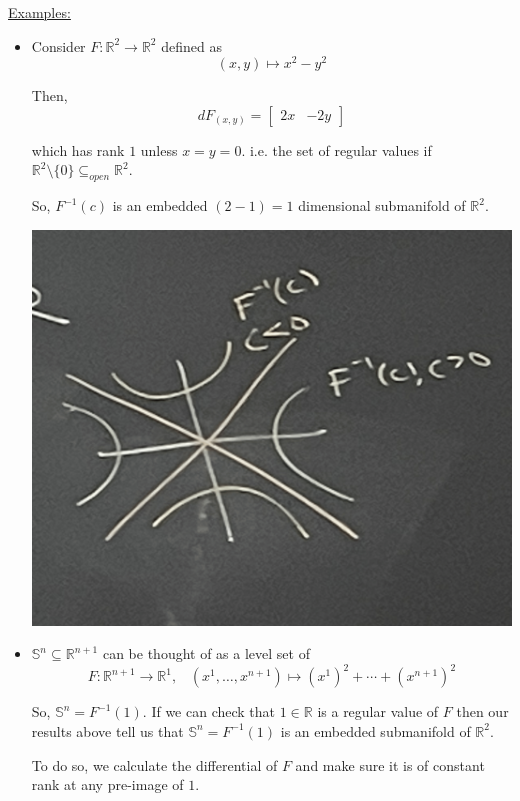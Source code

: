 \documentclass{article}
\newcommand{\R}{\mathbb{R}}
\begin{document}
\vskip 0.5cm
\underline{Examples:} 
\begin{itemize}
  \item Consider $F : \R^2 \rightarrow \R^2$ defined as 
  \[ (x, y) \mapsto x^2 - y^2 \]
  
  Then, 
  \[ dF_{(x, y)} = \begin{bmatrix}
    2x & -2y
  \end{bmatrix} \]
  
  which has rank $1$ unless $x = y = 0$. i.e. the set of regular values if $\R^2 \setminus \{0\} \subseteq_{open} \R^2$.
  
  So, $F^{-1}(c)$ is an embedded $(2-1) = 1$ dimensional submanifold of $\R^2$.

  \begin{center}
    \includegraphics*[scale=0.10]{submfd example.png}
  \end{center}

  \vskip 0.5cm
  \item $\mathbb{S}^n \subseteq \R^{n+1}$ can be thought of as a level set of 
  \[  F : \R^{n+1} \rightarrow \R^{1}, \;\;\; (x^1, \dots, x^{n+1}) \mapsto (x^1)^2 + \cdots + (x^{n+1})^2 \]

  So, $\mathbb{S}^n = F^{-1}(1)$. If we can check that $1 \in \R$ is a regular value of $F$ then our results above tell us that $\mathbb{S}^n = F^{-1}(1)$ is an embedded submanifold of $\R^2$.

  \vskip 0.5cm
  To do so, we calculate the differential of $F$ and make sure it is of constant rank at any pre-image of $1$.


\end{itemize}
\end{document}
